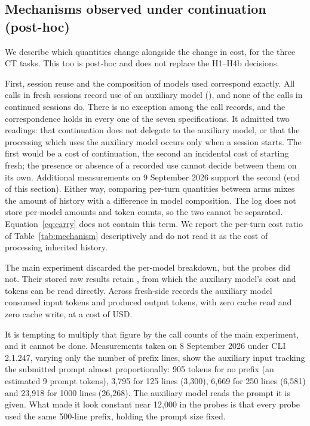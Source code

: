 \documentclass[a4paper,11pt]{article}
\newcommand{\spec}[1]{\texttt{\detokenize{#1}}}
\begin{document}
\subsection{Mechanisms observed under continuation (post-hoc)}\label{sec:mechanism}
We describe which quantities change alongside the change in cost, for the three CT tasks. This too is post-hoc and does not replace the H1--H4b decisions.

First, session reuse and the composition of models used correspond exactly. All \AuxFresh{} calls in fresh sessions record use of an auxiliary model (\spec{claude-haiku-4-5}), and none of the \AuxResumed{} calls in continued sessions do. There is no exception among the \CallRecords{} call records, and the correspondence holds in every one of the seven specifications. It admitted two readings: that continuation does not delegate to the auxiliary model, or that the processing which uses the auxiliary model occurs only when a session starts. The first would be a cost of continuation, the second an incidental cost of starting fresh; the presence or absence of a recorded use cannot decide between them on its own. Additional measurements on 9 September 2026 support the second (end of this section). Either way, comparing per-turn quantities between arms mixes the amount of history with a difference in model composition. The log does not store per-model amounts and token counts, so the two cannot be separated. Equation~\eqref{eq:carry} does not contain this term. We report the per-turn cost ratio of Table~\ref{tab:mechanism} descriptively and do not read it as the cost of processing inherited history.

The main experiment discarded the per-model breakdown, but the probes did not. Their stored raw results retain \spec{modelUsage}, from which the auxiliary model's cost and tokens can be read directly. Across \AuxN{} fresh-side records the auxiliary model consumed \AuxInput{} input tokens and produced \AuxOutput{} output tokens, with zero cache read and zero cache write, at a cost of \AuxCost{} USD.

It is tempting to multiply that figure by the call counts of the main experiment, and it cannot be done. Measurements taken on 8 September 2026 under CLI 2.1.247, varying only the number of prefix lines, show the auxiliary input tracking the submitted prompt almost proportionally: 905 tokens for no prefix (an estimated 9 prompt tokens), 3{,}795 for 125 lines (3{,}300), 6{,}669 for 250 lines (6{,}581) and 23{,}918 for 1000 lines (26{,}268). The auxiliary model reads the prompt it is given. What made it look constant near 12{,}000 in the probes is that every probe used the same 500-line prefix, holding the prompt size fixed.
\end{document}
